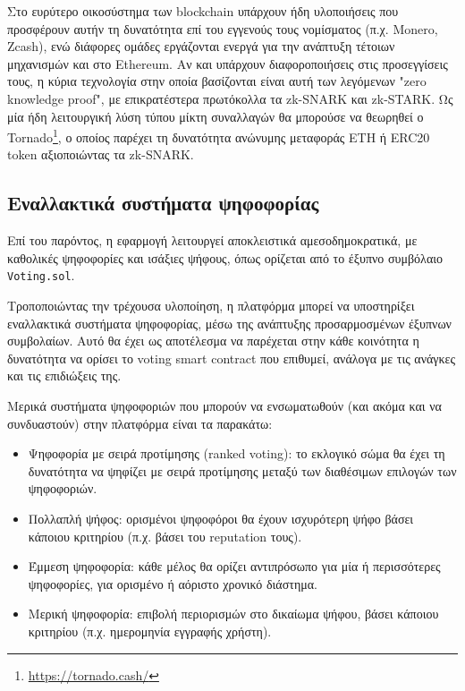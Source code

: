 Στο ευρύτερο οικοσύστημα των blockchain υπάρχουν ήδη υλοποιήσεις που προσφέρουν αυτήν τη δυνατότητα επί του εγγενούς τους νομίσματος (π.χ. Monero, Zcash), ενώ διάφορες ομάδες εργάζονται ενεργά για την ανάπτυξη τέτοιων μηχανισμών και στο Ethereum. Αν και υπάρχουν διαφοροποιήσεις στις προσεγγίσεις τους, η κύρια τεχνολογία στην οποία βασίζονται είναι αυτή των λεγόμενων "zero knowledge proof", με επικρατέστερα πρωτόκολλα τα zk-SNARK και zk-STARK. Ως μία ήδη λειτουργική λύση τύπου μίκτη συναλλαγών θα μπορούσε να θεωρηθεί ο Tornado\footnote{\url{https://tornado.cash/}}, ο οποίος παρέχει τη δυνατότητα ανώνυμης μεταφοράς ETH ή ERC20 token αξιοποιώντας τα zk-SNARK.\cite{5.2-privacy-on-ethereum}

\subsection{Εναλλακτικά συστήματα ψηφοφορίας}\label{subsection:5-2-3-alternative-voting-systems}

Επί του παρόντος, η εφαρμογή λειτουργεί αποκλειστικά αμεσοδημοκρατικά, με καθολικές ψηφοφορίες και ισάξιες ψήφους, όπως ορίζεται από το έξυπνο συμβόλαιο \texttt{Voting.sol}.

Τροποποιώντας την τρέχουσα υλοποίηση, η πλατφόρμα μπορεί να υποστηρίξει εναλλακτικά συστήματα ψηφοφορίας, μέσω της ανάπτυξης προσαρμοσμένων έξυπνων συμβολαίων. Αυτό θα έχει ως αποτέλεσμα να παρέχεται στην κάθε κοινότητα η δυνατότητα να ορίσει το voting smart contract που επιθυμεί, ανάλογα με τις ανάγκες και τις επιδιώξεις της.

Μερικά συστήματα ψηφοφοριών που μπορούν να ενσωματωθούν (και ακόμα και να συνδυαστούν) στην πλατφόρμα είναι τα παρακάτω:

\begin{itemize}
	\item Ψηφοφορία με σειρά προτίμησης (ranked voting): το εκλογικό σώμα θα έχει τη δυνατότητα να ψηφίζει με σειρά προτίμησης μεταξύ των διαθέσιμων επιλογών των ψηφοφοριών.
	\item Πολλαπλή ψήφος: ορισμένοι ψηφοφόροι θα έχουν ισχυρότερη ψήφο βάσει κάποιου κριτηρίου (π.χ. βάσει του reputation τους).
	\item Έμμεση ψηφοφορία: κάθε μέλος θα ορίζει αντιπρόσωπο για μία ή περισσότερες ψηφοφορίες, για ορισμένο ή αόριστο χρονικό διάστημα.
	\item Μερική ψηφοφορία: επιβολή περιορισμών στο δικαίωμα ψήφου, βάσει κάποιου κριτηρίου (π.χ. ημερομηνία εγγραφής χρήστη).
\end{itemize}

